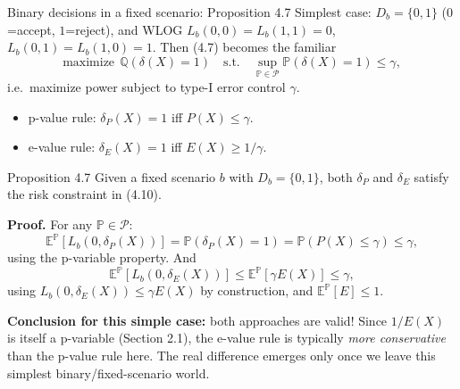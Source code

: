\documentclass[aspectratio=169,10pt]{beamer}
\begin{document}
\begin{frame}[allowframebreaks]{Binary decisions in a fixed scenario: Proposition 4.7}
  Simplest case: $D_b=\{0,1\}$ ($0$=accept, $1$=reject), and WLOG
  $L_b(0,0)=L_b(1,1)=0$, $L_b(0,1)=L_b(1,0)=1$. Then (4.7) becomes the
  familiar
  \[
    \text{maximize}\ \ \mathbb Q(\delta(X)=1)\quad\text{s.t.}\quad
    \sup_{\mathbb P\in\mathcal P}\mathbb P(\delta(X)=1)\le\gamma, \tag{4.10}
  \]
  i.e.\ maximize power subject to type-I error control $\gamma$.
  \begin{itemize}
    \item p-value rule: $\delta_P(X)=1$ iff $P(X)\le\gamma$.
    \item e-value rule: $\delta_E(X)=1$ iff $E(X)\ge 1/\gamma$.
  \end{itemize}

  \begin{block}{Proposition 4.7}
    Given a fixed scenario $b$ with $D_b=\{0,1\}$, both $\delta_P$ and
    $\delta_E$ satisfy the risk constraint in (4.10).
  \end{block}

  \framebreak
  \textbf{Proof.} For any $\mathbb P\in\mathcal P$:
  \[
    \mathbb E^{\mathbb P}[L_b(0,\delta_P(X))] = \mathbb P(\delta_P(X)=1) = \mathbb P(P(X)\le\gamma)\le\gamma,
  \]
  using the p-variable property. And
  \[
    \mathbb E^{\mathbb P}[L_b(0,\delta_E(X))] \le \mathbb E^{\mathbb P}[\gamma E(X)] \le \gamma,
  \]
  using $L_b(0,\delta_E(X))\le\gamma E(X)$ by construction, and
  $\mathbb E^{\mathbb P}[E]\le1$.

  \medskip
  \textbf{Conclusion for this simple case:} both approaches are valid! Since
  $1/E(X)$ is itself a p-variable (Section 2.1), the e-value rule is
  typically \emph{more conservative} than the p-value rule here. The real
  difference emerges only once we leave this simplest binary/fixed-scenario
  world.
\end{frame}
\end{document}
